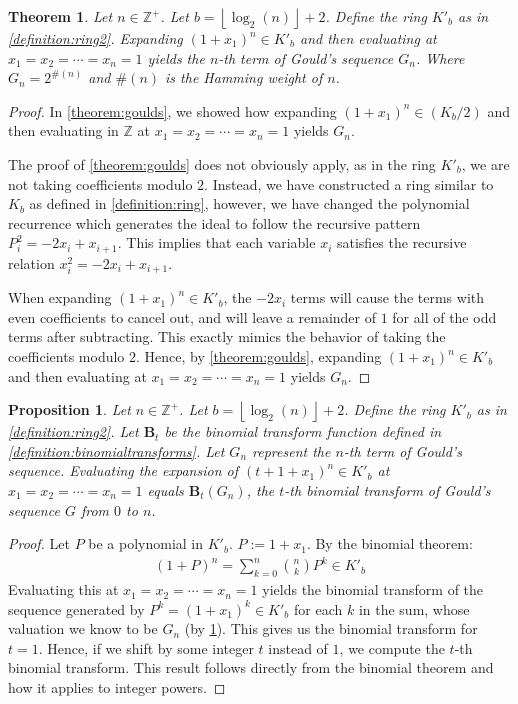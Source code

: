 \documentclass{article}
\theoremstyle{plain}
\theoremstyle{definition}
\newtheorem{theorem}{Theorem}
\newtheorem{proposition}{Proposition}
\newcommand{\floor}[1]{\left\lfloor #1 \right\rfloor}
\newcommand{\Z}{\mathbb{Z}}
\newcommand{\K}{K}
\newcommand{\BT}{\textbf{B}}
\newcommand{\wt}[1]{\#(#1)}
\begin{document}
\begin{theorem} \label{theorem:goulds2}
\textit{
Let $n \in \Z^+$. Let $b={\floor{\log_2(n)}+2}$. Define the ring $\K'_b$ as in \cref{definition:ring2}. Expanding $(1+x_1)^n \in \K'_b$ and then evaluating at $x_1=x_2=\cdots=x_n=1$ yields the $n$-th term of Gould's sequence $G_n$. Where $G_n = 2^{\wt{n}}$ and $\wt{n}$ is the Hamming weight of $n$.
}
\end{theorem}
\begin{proof}
In \cref{theorem:goulds}, we showed how expanding $(1+x_1)^n \in (\K_b/2)$ and then evaluating in $\Z$ at $x_1=x_2=\cdots=x_n=1$ yields $G_n$.

The proof of \cref{theorem:goulds} does not obviously apply, as in the ring $\K'_b$, we are not taking coefficients modulo $2$. Instead, we have constructed a ring similar to $K_b$ as defined in \cref{definition:ring}, however, we have changed the polynomial recurrence which generates the ideal to follow the recursive pattern $P_{i}^2 = -2 x_i + x_{i+1}$. This implies that each variable $x_i$ satisfies the recursive relation $x_i^2 = -2x_i + x_{i+1}$.

When expanding $(1+x_1)^n \in \K'_b$, the $-2x_i$ terms will cause the terms with even coefficients to cancel out, and will leave a remainder of $1$ for all of the odd terms after subtracting. This exactly mimics the behavior of taking the coefficients modulo $2$. Hence, by \cref{theorem:goulds}, expanding $(1+x_1)^n \in \K'_b$ and then evaluating at $x_1=x_2=\cdots=x_n=1$ yields $G_n$.
\end{proof}

\begin{proposition} \label{proposition:gouldbinomialtransforms}
\textit{
Let $n \in \Z^+$. Let $b={\floor{\log_2(n)}+2}$. Define the ring $\K'_b$ as in \cref{definition:ring2}. Let $\BT_t$ be the binomial transform function defined in \cref{definition:binomialtransforms}. Let $G_n$ represent the $n$-th term of Gould's sequence. Evaluating the expansion of $(t + 1 + x_1)^n \in \K'_b$ at $x_1=x_2=\cdots=x_n=1$ equals $\BT_t(G_n)$, the $t$-th binomial transform of Gould's sequence $G$ from $0$ to $n$.
}
\end{proposition}
\begin{proof}
Let $P$ be a polynomial in $\K'_b$. $P := 1 + x_1$. By the binomial theorem:
\begin{align*}
    (1 + P)^n = \sum_{k=0}^{n} \binom{n}{k} P^k \in \K'_b
\end{align*}
Evaluating this at $x_1=x_2=\cdots=x_n=1$ yields the binomial transform of the sequence generated by $P^k = (1 + x_1)^k \in \K'_b$ for each $k$ in the sum, whose valuation we know to be $G_n$ (by \cref{theorem:goulds2}). This gives us the binomial transform for $t=1$. Hence, if we shift by some integer $t$ instead of $1$, we compute the $t$-th binomial transform. This result follows directly from the binomial theorem and how it applies to integer powers.
\end{proof}
\end{document}
